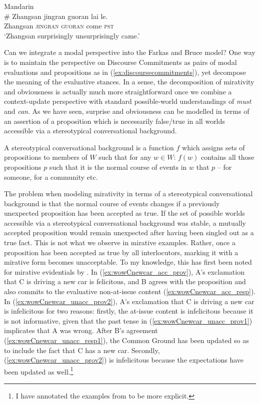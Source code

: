 \begin{exe} 
	\ex \label{ex:jingranguoranTOGETHER}Mandarin\\
	\# \gll Zhangsan jingran guoran lai le.\\
		 Zhangsan \textsc{jingran} \textsc{guoran} come \textsc{pst} \\
	\hphantom{\#} \glt `Zhangsan surprisingly unsurprisingly came.'
\end{exe}

Can we integrate a modal perspective into the Farkas and Bruce model? One way is to maintain the perspective on Discourse Commitments as pairs of modal evaluations and propositions as in  (\ref{ex:discoursecommitments}), yet decompose the meaning of the evaluative stances. In a sense, the decomposition of mirativity and obviousness is actually much more straightforward once we combine a context-update perspective with standard possible-world understandings of \textit{must} and \textit{can}. As we have seen, surprise and obviousness can be modelled in terms of an assertion of a proposition which is necessarily false\slash true in all worlds accessible via a stereotypical conversational background.

\begin{exe}
	\ex\label{ex:stereotypicalKRATZER}
	A stereotypical conversational background is a function $f$ which assigns sets of propositions to members of $W$ such that for any $w\in W$:
	$f(w)$ contains all those propositions $p$ such that it is the normal course of events in $w$ that $p$ -- for someone, for a community etc.\hfill \hbox{\citep[45]{Kratzer.1981}}
\end{exe}

The problem when modeling mirativity in terms of a stereotypical conversational background is that the normal course of events changes if a previously unexpected proposition has been accepted as true. If the set of possible worlds accessible via a stereotypical conversational background was stable, a mutually accepted proposition would remain unexpected after having been singled out as a true fact. This is not what we observe in mirative examples. Rather, once a proposition has been accepted as true by all interlocutors, marking it with a mirative form becomes unacceptable. To my knowledge, this has first been noted for mirative evidentials by \citet[456]{RettMurray.2013}. In (\ref{ex:wowCnewcar_acc_prov}), A's exclamation that C is driving a new car is felicitous, and B agrees with the proposition and also commits to the evaluative non-at-issue content (\ref{ex:wowCnewcar_acc_resp}). In (\ref{ex:wowCnewcar_unacc_prov2}), A's exclamation that C is driving a new car is infelicitous for two reasons: firstly, the at-issue content is infelicitous because it is not informative, given that the past tense in (\ref{ex:wowCnewcar_unacc_prov1}) implicates that A was wrong. After B's agreement (\ref{ex:wowCnewcar_unacc_resp1}), the Common Ground has been updated so as to include the fact that C has a new car. Secondly, (\ref{ex:wowCnewcar_unacc_prov2}) is infelicitous because the expectations have been updated as well.\footnote{I have annotated the examples from \citet[456]{RettMurray.2013} to be more explicit.}


